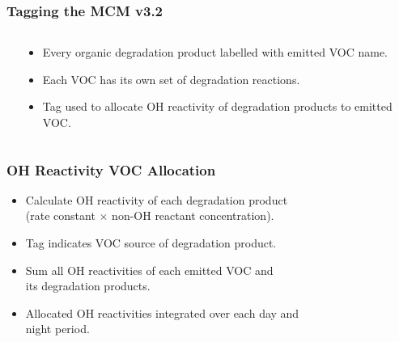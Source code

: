 \begin{frame}
    \frametitle{Tagging the MCM v3.2}
    \vspace{-5mm}

    \begin{columns}[onlytextwidth]
        \begin{column}{0.4\textwidth}
            \begin{flushleft}
                
            \end{flushleft}
        \end{column}%
        \begin{column}{0.55\textwidth}
            \begin{center}
                \begin{itemize}
                    \item Every organic degradation product labelled with emitted VOC name.
                    \item Each VOC has its own set of degradation reactions.
                    \item Tag used to allocate OH reactivity of degradation products to emitted VOC.
                \end{itemize}
            \end{center}
        \end{column}
    \end{columns}
\end{frame}

\begin{frame}
    \frametitle{OH Reactivity VOC Allocation}

    \begin{itemize}
        \item Calculate OH reactivity of each degradation product \\ (rate constant $\times$ non-OH reactant concentration). \vspace{2mm}
        \item Tag indicates VOC source of degradation product. \vspace{2mm}
        \item Sum all OH reactivities of each emitted VOC and \\ its degradation products. \vspace{2mm}
        \item Allocated OH reactivities integrated over each day and \\ night period.
    \end{itemize}
\end{frame}

